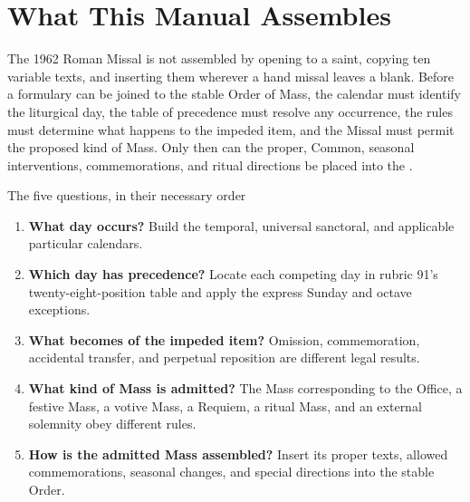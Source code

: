 \section{What This Manual Assembles}

The 1962 Roman Missal is not assembled by opening to a saint, copying ten variable texts, and inserting them wherever a hand missal leaves a blank. Before a formulary can be joined to the stable Order of Mass, the calendar must identify the liturgical day, the table of precedence must resolve any occurrence, the rules must determine what happens to the impeded item, and the Missal must permit the proposed kind of Mass. Only then can the proper, Common, seasonal interventions, commemorations, and ritual directions be placed into the .

\begin{studybox}{The five questions, in their necessary order}
\begin{enumerate}[leftmargin=1.45em]
\item \textbf{What day occurs?} Build the temporal, universal sanctoral, and applicable particular calendars.
\item \textbf{Which day has precedence?} Locate each competing day in rubric 91's twenty-eight-position table and apply the express Sunday and octave exceptions.
\item \textbf{What becomes of the impeded item?} Omission, commemoration, accidental transfer, and perpetual reposition are different legal results.
\item \textbf{What kind of Mass is admitted?} The Mass corresponding to the Office, a festive Mass, a votive Mass, a Requiem, a ritual Mass, and an external solemnity obey different rules.
\item \textbf{How is the admitted Mass assembled?} Insert its proper texts, allowed commemorations, seasonal changes, and special directions into the stable Order.
\end{enumerate}
\end{studybox}

